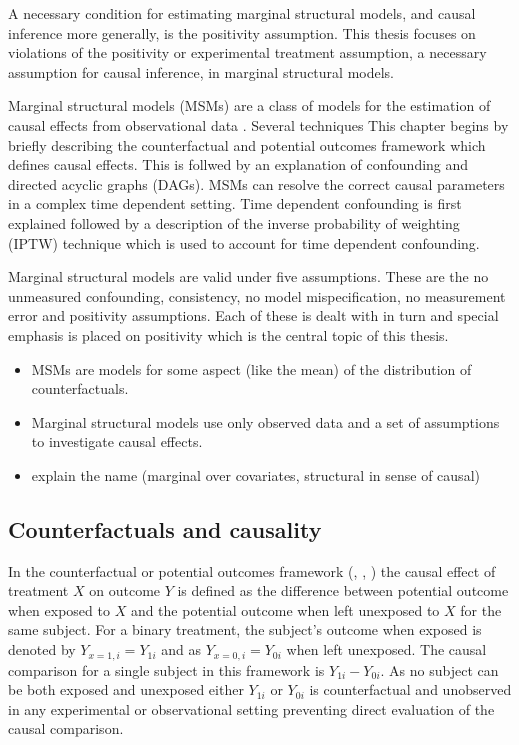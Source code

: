 \documentclass[11pt]{article}
\providecommand{\tightlist}{%
      \setlength{\itemsep}{0pt}\setlength{\parskip}{0pt}}
\begin{document}
A necessary condition for estimating marginal structural models, and
causal inference more generally, is the positivity assumption. This
thesis focuses on violations of the positivity or experimental treatment
assumption, a necessary assumption for causal inference, in marginal
structural models.

Marginal structural models (MSMs) are a class of models for the
estimation of causal effects from observational data \citet{Robins2000}.
Several techniques This chapter begins by briefly describing the
counterfactual and potential outcomes framework which defines causal
effects. This is follwed by an explanation of confounding and directed
acyclic graphs (DAGs). MSMs can resolve the correct causal parameters in
a complex time dependent setting. Time dependent confounding is first
explained followed by a description of the inverse probability of
weighting (IPTW) technique which is used to account for time dependent
confounding.

Marginal structural models are valid under five assumptions. These are
the no unmeasured confounding, consistency, no model mispecification, no
measurement error and positivity assumptions. Each of these is dealt
with in turn and special emphasis is placed on positivity which is the
central topic of this thesis.

\begin{itemize}
\tightlist
\item
  MSMs are models for some aspect (like the mean) of the distribution of
  counterfactuals.
\item
  Marginal structural models use only observed data and a set of
  assumptions to investigate causal effects.
\item
  explain the name (marginal over covariates, structural in sense of
  causal)
\end{itemize}

    \subsection{Counterfactuals and
causality}\label{counterfactuals-and-causality}

In the counterfactual or potential outcomes framework
(\citet{Neyman1923}, \citet{Rubin1978}, \citet{Robins1986}) the causal
effect of treatment \(X\) on outcome \(Y\) is defined as the difference
between potential outcome when exposed to \(X\) and the potential
outcome when left unexposed to \(X\) for the same subject. For a binary
treatment, the subject's outcome when exposed is denoted by
\(Y_{x=1,i} = Y_{1i}\) and as \(Y_{x=0,i} = Y_{0i}\) when left
unexposed. The causal comparison for a single subject in this framework
is \(Y_{1i} - Y_{0i}\). As no subject can be both exposed and unexposed
either \(Y_{1i}\) or \(Y_{0i}\) is counterfactual and unobserved in any
experimental or observational setting preventing direct evaluation of
the causal comparison. \linebreak
\end{document}

